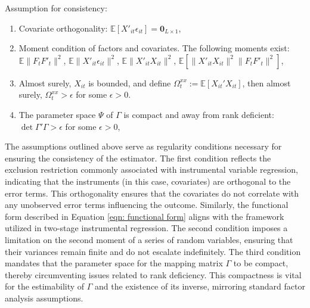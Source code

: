 \documentclass[12pt]{article}
\begin{document}
\begin{assumption}
Assumption for consistency:
\begin{enumerate}
    \item Covariate orthogonality: $\mathbb{E}\left[X'_{it} \epsilon_{it}\right] = \textbf{0}_{L\times 1}$,
    
    \item Moment condition of factors and covariates. The following moments exist: $\mathbb{E}\|F_{t}F'_{t}\|^2$, $\mathbb{E}\|X'_{it}\epsilon_{it}\|^2$, $\mathbb{E}\|X'_{it}X_{it}\|^2$, $\mathbb{E}\left[\|X'_{it}X_{it}\|^2\|F_{t}F'_{t}\|^2 \right]$, 

    \item Almost surely, $X_{it}$ is bounded, and define $\Omega_t^{xx} := \mathbb{E}\left[ X_{it}' X_{it} \right]$, then almost surely, $\Omega_t^{xx} > \epsilon$ for some $\epsilon > 0$.
    
    \item The parameter space $\Psi$ of $\Gamma$ is compact and away from rank deficient: $\det{\Gamma' \Gamma} > \epsilon$ for some $\epsilon>0$,
    
\end{enumerate}
\label{app: ass consistency}
\end{assumption}

The assumptions outlined above serve as regularity conditions necessary for ensuring the consistency of the estimator. The first condition reflects the exclusion restriction commonly associated with instrumental variable regression, indicating that the instruments (in this case, covariates) are orthogonal to the error terms. This orthogonality ensures that the covariates do not correlate with any unobserved error terms influencing the outcome. Similarly, the functional form described in Equation \ref{eqn: functional form} aligns with the framework utilized in two-stage instrumental regression. The second condition imposes a limitation on the second moment of a series of random variables, ensuring that their variances remain finite and do not escalate indefinitely. The third condition mandates that the parameter space for the mapping matrix $\Gamma$ to be compact, thereby circumventing issues related to rank deficiency. This compactness is vital for the estimability of $\Gamma$ and the existence of its inverse, mirroring standard factor analysis assumptions.
\end{document}
